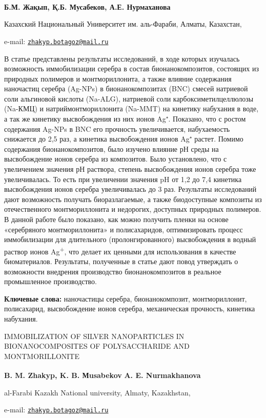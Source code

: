 {\bfseries Б.М. Жақып\textsuperscript{\envelope }, Қ.Б. Мусабеков, А.Е. Нурмаханова}

Казахский Национальный Университет им. аль-Фараби, Алматы, Казахстан,

e-mail:
\href{mailto:zhakyp.botagoz@mail.ru}{\nolinkurl{zhakyp.botagoz@mail.ru}}

В статье представлены результаты исследований, в ходе которых изучалась
возможность иммобилизации серебра в состав бионанокомпозитов, состоящих
из природных полимеров и монтмориллонита, а также влияние содержания
наночастиц серебра (Ag-NPs) в бионанокомпозитах (BNC) смесей натриевой
соли альгиновой кислоты (Na-ALG), натриевой соли карбоксиметилцеллюлозы
(Na-КМЦ) и натриймонтмориллонита (Na-MMT) на кинетику набухания в воде,
а так же кинетику высвобождения из них ионов Ag⁺. Показано, что с ростом
содержания Ag-NPs в BNC его прочность увеличивается, набухаемость
снижается до 2,5 раз, а кинетика высвобождения ионов Ag⁺ растет. Помимо
содержания бионанокомпозитов, было изучено влияние рН среды на
высвобождение ионов серебра из композитов. Было установлено, что с
увеличением значения рН раствора, степень высвобождения ионов серебра
тоже увеличивалась. То есть при увеличении значения pH от 1,2 до 7,4
кинетика высвобождения ионов серебра увеличивалась до 3 раз. Результаты
исследований дают возможность получать биоразлагаемые, а также
биодоступные композиты из отечественного монтмориллонита и недорогих,
доступных природных полимеров. В данной работе было показано, как можно
получить пленки на основе «серебряного монтмориллонита» и полисахаридов,
оптимизировать процесс иммобилизации для длительного (пролонгированного)
высвобождения в водный раствор ионов Ag\textsuperscript{+}, что делает
их ценными для использования в качестве биоматериалов. Результаты,
полученные в статье дают повод утверждать о возможности внедрения
производство бионанокомпозитов в реальное промышленное производство.

{\bfseries Ключевые слова:} наночастицы серебра, бионанокомпозит,
монтмориллонит, полисахарид, высвобождение ионов серебра, механическая
прочность, кинетика набухания.

IMMOBILIZATION OF SILVER NANOPARTICLES IN BIONANOCOMPOSITES OF
POLYSACCHARIDE AND MONTMORILLONITE

{\bfseries B. M. Zhakyp\textsuperscript{\envelope }, K. B. Мusabekov} {\bfseries A. E.
Nurmakhanova}

al-Farabi Kazakh National university, Almaty, Kazakhstan,

e-mail:
\href{mailto:zhakyp.botagoz@mail.ru}{\nolinkurl{zhakyp.botagoz@mail.ru}}

